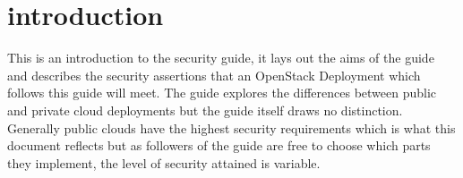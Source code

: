 \chapter{introduction}
This is an introduction to the security guide, it lays out the aims of the guide and describes the security assertions that an OpenStack Deployment which follows this guide will meet. The guide explores the differences between public and private cloud deployments but the guide itself draws no distinction. Generally public clouds have the highest security requirements which is what this document reflects but as followers of the guide are free to choose which parts they implement, the level of security attained is variable.